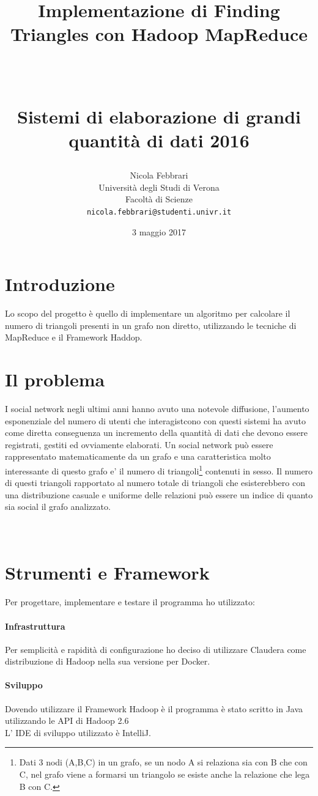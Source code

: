 \documentclass[paper=a4, fontsize=11pt]{scrartcl}	%
\title{ \vspace{-1in} 	\usefont{OT1}{bch}{b}{n}
		\huge \strut Implementazione di Finding Triangles con Hadoop MapReduce\strut \\
		\Large \bfseries \strut Sistemi di elaborazione di grandi quantità di dati 2016 \strut
}
\author{ 									\usefont{OT1}{bch}{m}{n}
        Nicola Febbrari\\		\usefont{OT1}{bch}{m}{n}
        Università degli Studi di Verona\\	\usefont{OT1}{bch}{m}{n}
        Facoltà di Scienze\\
        \texttt{nicola.febbrari@studenti.univr.it}
}
\date{3 maggio 2017}
\numberwithin{equation}{section}															%
\numberwithin{figure}{section}																%
\numberwithin{table}{section}																%
\begin{document}
\maketitle
\section{Introduzione}
Lo scopo del progetto è quello di implementare un algoritmo per calcolare il numero di triangoli presenti in un grafo non diretto, utilizzando le tecniche di MapReduce e il Framework Haddop.


\section{Il problema}
I social network negli ultimi anni hanno avuto una notevole diffusione, l'aumento esponenziale del numero di utenti che interagistcono con questi sistemi 
ha avuto come diretta conseguenza un  incremento della quantità di dati che devono essere registrati, gestiti ed ovviamente elaborati.
Un social network può essere rappresentato matematicamente da un grafo e una caratteristica molto interessante di questo grafo e' il numero di 
triangoli\footnote{Dati 3 nodi (A,B,C) in un grafo, se un nodo A si relaziona sia con B che con C, nel grafo viene a formarsi un triangolo se esiste anche la relazione che lega B con C.} 
contenuti in sesso. 
Il numero di questi triangoli rapportato al numero totale di triangoli che esisterebbero con una distribuzione casuale e uniforme delle relazioni può essere un indice di quanto sia social il grafo analizzato.\\
\\
\\
\section{Strumenti e Framework}
Per progettare, implementare e testare il programma ho utilizzato:
\paragraph{Infrastruttura}
Per semplicità e rapidità di configurazione ho deciso di utilizzare Claudera come distribuzione di Hadoop nella sua versione per Docker.

\paragraph{Sviluppo}
Dovendo utilizzare il Framework Hadoop è il programma è stato scritto in Java utilizzando le API di Hadoop 2.6\\
L' IDE di sviluppo utilizzato è IntelliJ.  
\end{document}
